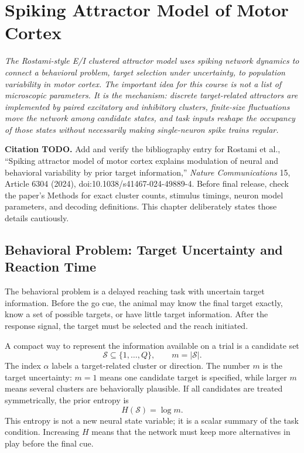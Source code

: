 \chapter{Spiking Attractor Model of Motor Cortex}
\label{ch:spiking-attractor-motor-cortex}

\textit{The Rostami-style E/I clustered attractor model uses spiking network dynamics to connect a behavioral problem, target selection under uncertainty, to population variability in motor cortex. The important idea for this course is not a list of microscopic parameters. It is the mechanism: discrete target-related attractors are implemented by paired excitatory and inhibitory clusters, finite-size fluctuations move the network among candidate states, and task inputs reshape the occupancy of those states without necessarily making single-neuron spike trains regular.}

\noindent\textbf{Citation TODO.} Add and verify the bibliography entry for Rostami et al., ``Spiking attractor model of motor cortex explains modulation of neural and behavioral variability by prior target information,'' \textit{Nature Communications} 15, Article 6304 (2024), doi:10.1038/s41467-024-49889-4. Before final release, check the paper's Methods for exact cluster counts, stimulus timings, neuron model parameters, and decoding definitions. This chapter deliberately states those details cautiously.

\section{Behavioral Problem: Target Uncertainty and Reaction Time}
\label{sec:behavioral-problem-target-uncertainty-reaction-time}

The behavioral problem is a delayed reaching task with uncertain target information. Before the go cue, the animal may know the final target exactly, know a set of possible targets, or have little target information. After the response signal, the target must be selected and the reach initiated.

A compact way to represent the information available on a trial is a candidate set
%
\begin{equation}
  \mathcal{S}
  \subseteq
  \{1,\ldots,Q\},
  \qquad
  m = |\mathcal{S}|.
  \label{eq:target-candidate-set}
\end{equation}
%
The index $\alpha$ labels a target-related cluster or direction. The number $m$ is the target uncertainty: $m=1$ means one candidate target is specified, while larger $m$ means several clusters are behaviorally plausible. If all candidates are treated symmetrically, the prior entropy is
%
\begin{equation}
  H(\mathcal{S})=\log m.
  \label{eq:target-set-entropy}
\end{equation}
%
This entropy is not a new neural state variable; it is a scalar summary of the task condition. Increasing $H$ means that the network must keep more alternatives in play before the final cue.

